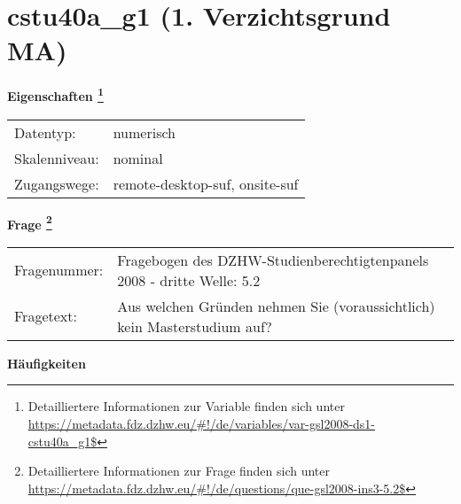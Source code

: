 
    \setcounter{footnote}{0}

    \vspace*{-1.8cm}
	\section{cstu40a\_g1 (1. Verzichtsgrund MA)}
	\label{section:cstu40a_g1}



    \vspace*{0.5cm}
    \noindent\textbf{Eigenschaften
	\footnote{Detailliertere Informationen zur Variable finden sich unter
		\url{https://metadata.fdz.dzhw.eu/\#!/de/variables/var-gsl2008-ds1-cstu40a_g1$}}}\\
	\begin{tabularx}{\hsize}{@{}lX}
	Datentyp: & numerisch \\
	Skalenniveau: & nominal \\
	Zugangswege: &
	  remote-desktop-suf, 
	  onsite-suf
 \\
    \end{tabularx}



				\vspace*{0.5cm}
                \noindent\textbf{Frage
	                \footnote{Detailliertere Informationen zur Frage finden sich unter
		              \url{https://metadata.fdz.dzhw.eu/\#!/de/questions/que-gsl2008-ins3-5.2$}}}\\
				\begin{tabularx}{\hsize}{@{}lX}
					Fragenummer: &
					  Fragebogen des DZHW-Studienberechtigtenpanels 2008 - dritte Welle:
					  5.2
 \\
					Fragetext: & Aus welchen Gründen nehmen Sie (voraussichtlich) kein Masterstudium auf? \\
				\end{tabularx}





        		\vspace*{0.5cm}
                \noindent\textbf{Häufigkeiten}

